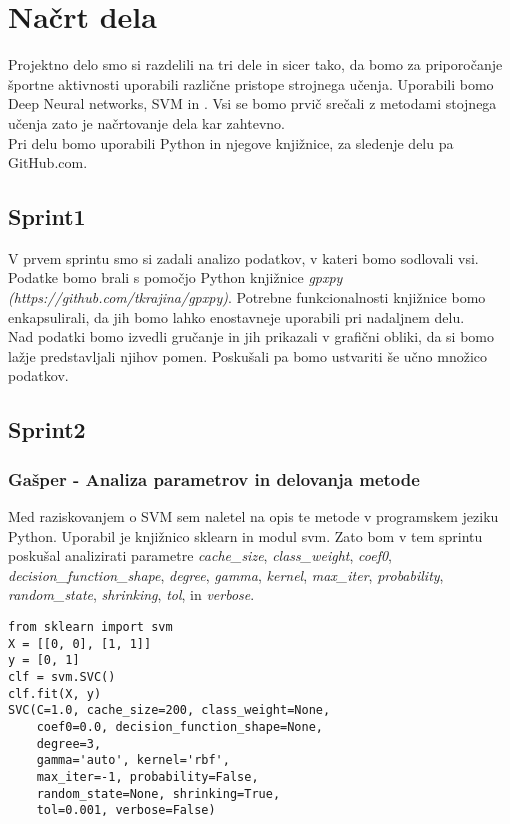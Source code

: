 \documentclass[a4paper,11pt]{article}
\begin{document}
\section{Načrt dela}

Projektno delo smo si razdelili na tri dele in sicer tako, da bomo za priporočanje športne aktivnosti uporabili različne pristope strojnega učenja. 
Uporabili bomo Deep Neural networks, SVM in . 
Vsi se bomo prvič srečali z metodami stojnega učenja zato je načrtovanje dela kar zahtevno. \\
Pri delu bomo uporabili Python in njegove knjižnice, za sledenje delu pa GitHub.com. 

\subsection{Sprint1}
V prvem sprintu smo si zadali analizo podatkov, v kateri bomo sodlovali vsi. Podatke bomo brali s pomočjo Python knjižnice \textit{gpxpy (https://github.com/tkrajina/gpxpy)}. Potrebne funkcionalnosti knjižnice bomo enkapsulirali, da jih bomo lahko enostavneje uporabili pri nadaljnem delu.\\ Nad podatki bomo izvedli gručanje in jih prikazali v grafični obliki, da si bomo lažje predstavljali njihov pomen. Poskušali pa bomo ustvariti še učno množico podatkov.


\subsection{Sprint2}
\subsubsection{Gašper - Analiza parametrov in delovanja metode}
Med raziskovanjem o SVM sem naletel na opis te metode v programskem jeziku Python. Uporabil je knjižnico sklearn in modul svm. Zato bom v tem sprintu poskušal analizirati parametre \textit{cache_size}, \textit{class_weight}, \textit{coef0}, \textit{decision_function_shape}, \textit{degree}, \textit{gamma}, \textit{kernel}, \textit{max_iter}, \textit{probability}, \textit{random_state}, \textit{shrinking}, \textit{tol}, in \textit{verbose}. \\

\begin{lstlisting}[caption={Uporaba SVM v Pythonu},captionpos=b]
from sklearn import svm
X = [[0, 0], [1, 1]]
y = [0, 1]
clf = svm.SVC()
clf.fit(X, y)  
SVC(C=1.0, cache_size=200, class_weight=None, 
	coef0=0.0, decision_function_shape=None, 
	degree=3,
    gamma='auto', kernel='rbf',
    max_iter=-1, probability=False, 
    random_state=None, shrinking=True,
    tol=0.001, verbose=False)
\end{lstlisting}
\end{document}
